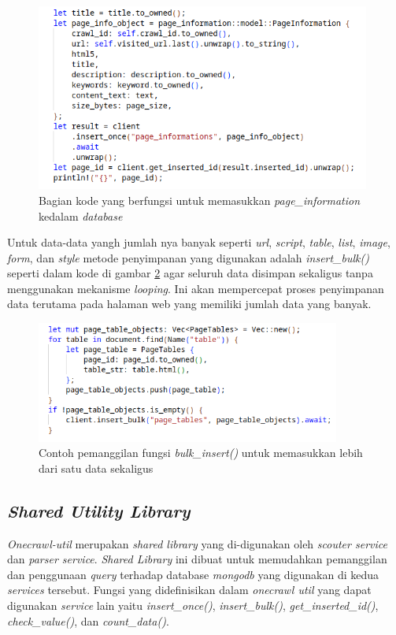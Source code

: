 \begin{figure}[H]
  \centering
  \includegraphics[keepaspectratio, width=11cm]{gambar/insert-page-info.png}
  \caption{Bagian kode yang berfungsi untuk memasukkan \emph{page\_information} kedalam \emph{database}}
  \label{gambar:insert-page-info}
\end{figure}

Untuk data-data yangh jumlah nya banyak seperti \emph{url}, \emph{script}, \emph{table}, \emph{list}, \emph{image}, \emph{form}, dan \emph{style} metode penyimpanan yang digunakan adalah \emph{insert\_bulk()} seperti dalam kode di gambar \ref{gambar:bulk-insert} agar seluruh data disimpan sekaligus tanpa menggunakan mekanisme \emph{looping}. Ini akan mempercepat proses penyimpanan data terutama pada halaman web yang memiliki jumlah data yang banyak.

\begin{figure}[H]
  \centering
  \includegraphics[keepaspectratio, width=10cm]{gambar/bulk-insert-code.png}
  \caption{Contoh pemanggilan fungsi \emph{bulk\_insert()} untuk memasukkan lebih dari satu data sekaligus}
  \label{gambar:bulk-insert}
\end{figure}

\subsection{\emph{Shared Utility Library}}

\emph{Onecrawl-util} merupakan \emph{shared library} yang di-digunakan oleh \emph{scouter service} dan \emph{parser service}. \emph{Shared Library} ini dibuat untuk memudahkan pemanggilan dan penggunaan \emph{query} terhadap database \emph{mongodb} yang digunakan di kedua \emph{services} tersebut. Fungsi yang didefinisikan dalam \emph{onecrawl util} yang dapat digunakan \emph{service} lain yaitu \emph{insert\_once()}, \emph{insert\_bulk()}, \emph{get\_inserted\_id()}, \emph{check\_value()}, dan \emph{count\_data()}.

